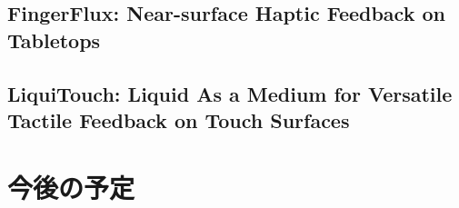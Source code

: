 \documentclass[11pt,a4paper]{jarticle}
\begin{document}
\subsection{FingerFlux: Near-surface Haptic Feedback on Tabletops\cite{Weiss:2011}}

\subsection{LiquiTouch: Liquid As a Medium for Versatile Tactile Feedback on Touch Surfaces\cite{Richter:2013}}


\section{今後の予定}



\end{document}
